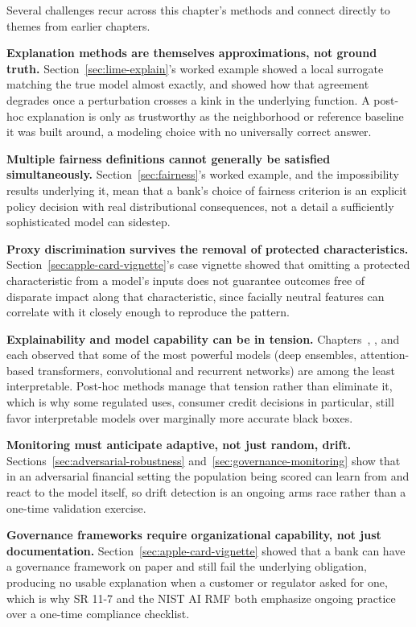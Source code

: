 \documentclass[../ai_in_finance]{subfiles}
\begin{document}
Several challenges recur across this chapter's methods and connect directly to themes from earlier chapters.

\textbf{Explanation methods are themselves approximations, not ground truth.} Section~\ref{sec:lime-explain}'s worked example showed a local surrogate matching the true model almost exactly, and showed how that agreement degrades once a perturbation crosses a kink in the underlying function. A post-hoc explanation is only as trustworthy as the neighborhood or reference baseline it was built around, a modeling choice with no universally correct answer.

\textbf{Multiple fairness definitions cannot generally be satisfied simultaneously.} Section~\ref{sec:fairness}'s worked example, and the impossibility results underlying it, mean that a bank's choice of fairness criterion is an explicit policy decision with real distributional consequences, not a detail a sufficiently sophisticated model can sidestep.

\textbf{Proxy discrimination survives the removal of protected characteristics.} Section~\ref{sec:apple-card-vignette}'s case vignette showed that omitting a protected characteristic from a model's inputs does not guarantee outcomes free of disparate impact along that characteristic, since facially neutral features can correlate with it closely enough to reproduce the pattern.

\textbf{Explainability and model capability can be in tension.} Chapters~, , and~ each observed that some of the most powerful models (deep ensembles, attention-based transformers, convolutional and recurrent networks) are among the least interpretable. Post-hoc methods manage that tension rather than eliminate it, which is why some regulated uses, consumer credit decisions in particular, still favor interpretable models over marginally more accurate black boxes.

\textbf{Monitoring must anticipate adaptive, not just random, drift.} Sections~\ref{sec:adversarial-robustness} and~\ref{sec:governance-monitoring} show that in an adversarial financial setting the population being scored can learn from and react to the model itself, so drift detection is an ongoing arms race rather than a one-time validation exercise.

\textbf{Governance frameworks require organizational capability, not just documentation.} Section~\ref{sec:apple-card-vignette} showed that a bank can have a governance framework on paper and still fail the underlying obligation, producing no usable explanation when a customer or regulator asked for one, which is why SR 11-7 and the NIST AI RMF both emphasize ongoing practice over a one-time compliance checklist.
\end{document}

